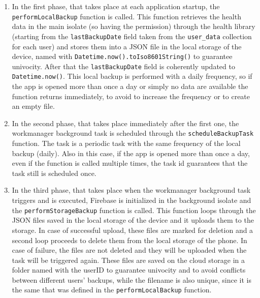 \begin{enumerate}[nosep] %
    \item In the first phase, that takes place at each application startup, the \newline \texttt{performLocalBackup} function is called. This function retrieves the health data in the main isolate (so having the permission) through the health library (starting from the \texttt{lastBackupDate} field taken from the \texttt{user\_data} collection for each user) and stores them into a JSON file in the local storage of the device, named with \texttt{Datetime.now().toIso8601String()} to guarantee univocity. After that the \texttt{lastBackupDate} field is coherently updated to \texttt{Datetime.now()}. This local backup is performed with a daily frequency, so if the app is opened more than once a day or simply no data are available the function returns immediately, to avoid to increase the frequency or to create an empty file.
    \item In the second phase, that takes place immediately after the first one, the workmanager background task is scheduled through the \texttt{scheduleBackupTask} function. The task is a periodic task with the same frequency of the local backup (daily). Also in this case, if the app is opened more than once a day, even if the function is called multiple times, the task id guarantees that the task still is scheduled once.
    \item In the third phase, that takes place when the workmanager background task triggers and is executed, Firebase is initialized in the background isolate and the \texttt{performStorageBackup} function is called. This function loops through the JSON files saved in the local storage of the device and it uploads them to the storage. In case of successful upload, these files are marked for deletion and a second loop proceeds to delete them from the local storage of the phone. In case of failure, the files are not deleted and they will be uploaded when the task will be triggered again. These files are saved on the cloud storage in a folder named with the userID to guarantee univocity and to avoid conflicts between different users' backups, while the filename is also unique, since it is the same that was defined in the \texttt{performLocalBackup} function.
\end{enumerate}

